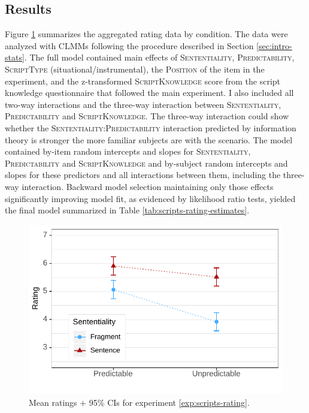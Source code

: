 \subsection{Results}
Figure \ref{fig:scripts-rating-means} summarizes the aggregated rating data by condition. The data were analyzed with CLMMs following the procedure described in Section \ref{sec:intro-stats}. The full model contained main effects of \textsc{Sententiality}, \textsc{Predictability}, \textsc{ScriptType} (situational/instrumental), the \textsc{Position} of the item in the experiment, and the z-transformed \textsc{ScriptKnowledge} score from the script knowledge questionnaire that followed the main experiment. I also included all two-way interactions and the three-way interaction between \textsc{Sententiality}, \textsc{Predictability} and \textsc{ScriptKnowledge}. The three-way interaction could show whe\-ther the \textsc{Sententiali\-ty:Predicta\-bility} interaction predicted by information theory is stronger the more familiar subjects are with the scenario. The model contained by-item random intercepts and slopes for \textsc{Sententiality}, \textsc{Predictability} and \textsc{ScriptKnowledge} and by-subject random intercepts and slopes for these predictors and all interactions between them, including the three-way interaction. Backward model selection maintaining only those effects significantly improving model fit, as evidenced by likelihood ratio tests, yielded the final model summarized in Table \ref{tab:scripts-rating-estimates}. 

\begin{figure}
\includegraphics[scale=1]{figures/scr_rating_estimates}
 \caption{Mean ratings $+$ 95\% CIs for experiment \ref{exp:scripts-rating}. \label{fig:scripts-rating-means}}
\end{figure}

